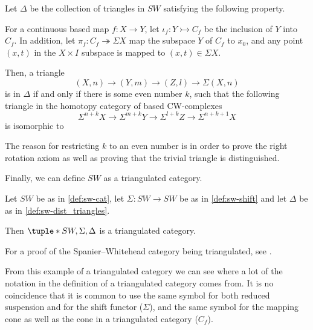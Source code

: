 \begin{definition}
    \label{def:sw-dist_triangles}
    Let \( \Delta \) be the collection of triangles in \( SW \) satisfying the following property.

    For a continuous based map \( f: X \to Y \), let \( \iota_f: Y \rightarrowtail C_f \) be the inclusion of \( Y \) into \( C_f \). In addition, let \( \pi_f: C_f \twoheadrightarrow \Sigma X \) map the subspace \( Y \) of \( C_f \) to \( x_0 \), and any point \( (x, t) \) in the \( X \times I \) subspace is mapped to \( (x, t) \in \Sigma X \).
    
    Then, a triangle
    \[
        (X, n) \to (Y, m) \to (Z, l) \to \Sigma (X, n)
    \]
    is in \( \Delta \) if and only if there is some even number \( k \), such that the following triangle in the homotopy category of based CW-complexes
    \[
        \Sigma^{n + k} X \to \Sigma^{m + k} Y \to \Sigma^{l + k} Z \to \Sigma^{n + k + 1} X
    \]
    is isomorphic to
    \begin{center}
    \end{center}
\end{definition}

The reason for restricting \( k \) to an even number is in order to prove the right rotation axiom as well as proving that the trivial triangle is distinguished.

Finally, we can define \( SW \) as a triangulated category.

\begin{example}
    Let \( SW \) be as in \autoref{def:sw-cat}, let \( \Sigma: SW \to SW \) be as in \autoref{def:sw-shift} and let \( \Delta \) be as in \autoref{def:sw-dist_triangles}.

    Then \( \tuple*{SW, \Sigma, \Delta} \) is a triangulated category.
\end{example}

For a proof of the Spanier--Whitehead category being triangulated, see \cite[Theorem 5.9]{Daria_Bachelor}.

From this example of a triangulated category we can see where a lot of the notation in the definition of a triangulated category comes from. It is no coincidence that it is common to use the same symbol for both reduced suspension and for the shift functor (\( \Sigma \)), and the same symbol for the mapping cone as well as the cone in a triangulated category (\( C_f \)).